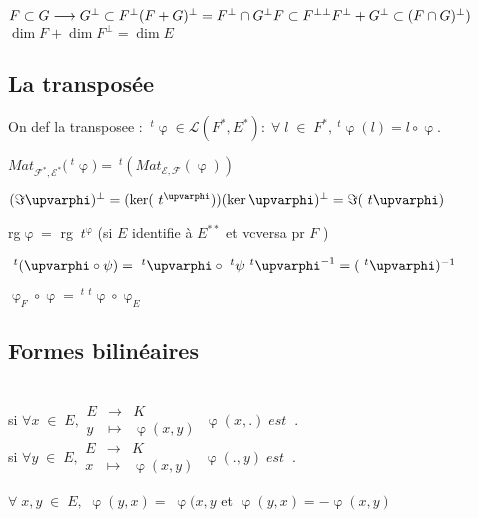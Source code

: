 \documentclass[11pt]{article} %
\begin{document}
\proposition $F \subset G \longrightarrow  G^{\bot} \subset F^{\bot}  \\  (F+G)^{\bot} = F^{\bot} \cap G^{\bot} \\ F \subset F^{\bot \bot } \\ F^{\bot} + G^{\bot} \subset (F \cap G)^{\bot}) $ \\ $\dim F + \dim F^{\bot} = \dim E$
\subsection{La transposée}

 On def la transposee : $~^t{\upvarphi} \in \mathcal{L}(F^{*},E^{*}) : \; \forall \; l \; \in \; F^{*}, ~^t{\upvarphi}(l) = l \circ \upvarphi$.

\proposition $Mat_{\mathcal{F^{*}}, \mathcal{E}^{*} }(~^t{\upvarphi)} = ~^t{(Mat_{\mathcal{E}, \mathcal{F}}(\upvarphi) )}$

\proposition $(\Im \upvarphi)^{\bot}= (\ker(~t^{\upvarphi})) \\  (\ker \upvarphi)^{\bot} = \Im(~t{\upvarphi})$

\proposition rg$ \upvarphi = $ rg $~t^{\upvarphi}$ (si $E$ identifie à $E^{**}$ et vcversa pr $F$ )

\proposition $~^t{(\upvarphi \circ \psi)} = ~^t{\upvarphi} \circ ~^t{\psi} \\ ~^t{\upvarphi^{-1} = (~^t{\upvarphi})^{-1}}$

\proposition $\upvarphi_{F} \circ \upvarphi = ~^t{~^t{\upvarphi}} \circ \upvarphi_{E}$

\subsection{Formes bilinéaires}

\proposition {} \\ si $\forall x \; \in \; E,
\begin{array}{rcl}
E &\to& K\\
y &\mapsto & \upvarphi(x,y)
\end{array}  \; \upvarphi(x,.) \;  est  \; \;   . $  \\
si $\forall y \; \in \; E,
\begin{array}{rcl}
E &\to& K\\
x &\mapsto & \upvarphi(x,y)
\end{array}  \; \upvarphi(.,y) \;  est  \; \;   . $ 

\proposition $\forall \; x,y \; \in \; E, $  $\upvarphi(y,x)= \; \upvarphi(x,y$ et  $\upvarphi(y,x)= - \upvarphi(x,y)$
\end{document}
